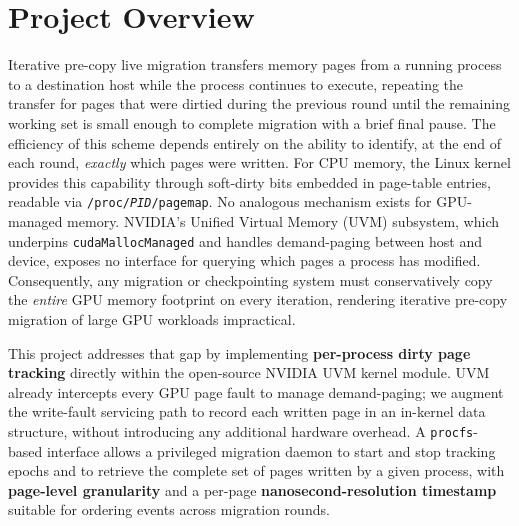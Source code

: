 \section*{Project Overview}

Iterative pre-copy live migration transfers memory pages from a running process
to a destination host while the process continues to execute, repeating the
transfer for pages that were dirtied during the previous round until the
remaining working set is small enough to complete migration with a brief final
pause.
The efficiency of this scheme depends entirely on the ability to identify,
at the end of each round, \emph{exactly} which pages were written.
For CPU memory, the Linux kernel provides this capability through soft-dirty
bits embedded in page-table entries, readable via \texttt{/proc/\textit{PID}/pagemap}.
No analogous mechanism exists for GPU-managed memory.
NVIDIA's Unified Virtual Memory (UVM) subsystem, which underpins \texttt{cudaMallocManaged}
and handles demand-paging between host and device, exposes no interface for
querying which pages a process has modified. Consequently, any migration or 
checkpointing system must conservatively copy the \emph{entire} GPU memory 
footprint on every iteration, rendering iterative pre-copy migration of
 large GPU workloads impractical.

This project addresses that gap by implementing \textbf{per-process dirty page
tracking} directly within the open-source NVIDIA UVM kernel module.
UVM already intercepts every GPU page fault to manage demand-paging; we augment
the write-fault servicing path to record each written page in an in-kernel
data structure, without introducing any additional hardware overhead.
A \texttt{procfs}-based interface allows a privileged migration daemon to
start and stop tracking epochs and to retrieve the complete set of pages written
by a given process, with \textbf{page-level granularity} and a per-page
\textbf{nanosecond-resolution timestamp} suitable for ordering events across
migration rounds.
